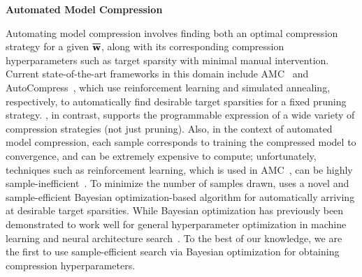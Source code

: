 \noindent \textbf{Automated Model Compression}
\begin{comment}
Bayesian optimization has previously been demonstrated to work well for general hyperparameter optimization in machine learning and neural architecture search~\cite{snoek2012practical,dai2019chamnet}.
To the best of our knowledge, we are the first to use sample-efficient search via Bayesian optimization for obtaining compression hyperparameters.
Automation in model compression is currently achieved either through reinforcement learning (RL) algorithms~\cite{he2018amc} or simulated annealing~\cite{liu2019autoslim}. 
In particular, the automation procedure for AMC~\cite{he2018amc} uses four arbitrary stages of pruning and re-training for RL training; additionally, the reward function is difficult to design, and even given a good reward, local optima can be hard to escape. It is also difficult to determine when such methods may just be overfitting to irrelevant patterns in the environment. Even disregarding generalization issues, AMC's agent (DDPG) uses trial and error, which is characterized to have an underlying incompatibility with the target pruning problem \cite{liu2019autoslim}.
AutoSlim~\cite{liu2019autoslim} proposes an automated approach based on simulated annealing, and uses the ADMM algorithm for accuracy recovery, which is an AL-based method very similar to the L-C algorithm; AutoSlim, however, only supports weight pruning and does not support general compression schemes as \algoName does. 
\end{comment}
Automating model compression involves finding both an optimal compression strategy for a given $\overline{{\bf w}}$, along with its corresponding compression hyperparameters such as target sparsity with minimal manual intervention. Current state-of-the-art frameworks in this domain include AMC~\cite{he2018amc} and AutoCompress~\cite{liu2019autoslim}, which use reinforcement learning and simulated annealing, respectively, to automatically find desirable target sparsities for a fixed pruning strategy. \algoName, in contrast, supports the programmable expression of a wide variety of compression strategies (not just pruning). Also, in the context of automated model compression, each sample corresponds to training the compressed model to convergence, and can be extremely expensive to compute; unfortunately, techniques such as reinforcement learning, which is used in AMC~\cite{he2018amc}, can be highly sample-inefficient~\cite{mnih2013playing}. To minimize the number of samples drawn, \algoName uses a novel and sample-efficient Bayesian optimization-based algorithm for automatically arriving at desirable target sparsities. While Bayesian optimization has previously been demonstrated to work well for general hyperparameter optimization in machine learning and neural architecture search~\cite{snoek2012practical,dai2019chamnet}.
To the best of our knowledge, we are the first to use sample-efficient search via Bayesian optimization for obtaining compression hyperparameters.
%


